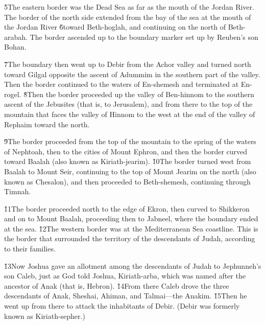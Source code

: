 \v{5}The eastern border was the Dead Sea as far as the mouth of the Jordan River. The border of the north side extended from the bay of the sea at the mouth of the Jordan River \v{6}toward Beth-hoglah, and continuing on the north of Beth-arabah. The border ascended up to the boundary marker set up by Reuben's son Bohan.

\v{7}The boundary then went up to Debir from the Achor valley and turned north toward Gilgal opposite the ascent of Adummim in the southern part of the valley. Then the border continued to the waters of En-shemesh and terminated at En-rogel. \v{8}Then the border proceeded up the valley of Ben-hinnom to the southern ascent of the Jebusites (that is, to Jerusalem), and from there to the top of the mountain that faces the valley of Hinnom to the west at the end of the valley of Rephaim toward the north.

\v{9}The border proceeded from the top of the mountain to the spring of the waters of Nephtoah, then to the cities of Mount Ephron, and then the border curved toward Baalah (also known as Kiriath-jearim). \v{10}The border turned west from Baalah to Mount Seir, continuing to the top of Mount Jearim on the north (also known as Chesalon), and then proceeded to Beth-shemesh, continuing through Timnah.

\v{11}The border proceeded north to the edge of Ekron, then curved to Shikkeron and on to Mount Baalah, proceeding then to Jabneel, where the boundary ended at the sea. \v{12}The western border was at the Mediterranean Sea coastline. This is the border that surrounded the territory of the descendants of Judah, according to their families.

\v{13}Now Joshua gave an allotment among the descendants of Judah to Jephunneh's son Caleb, just as God told Joshua, Kiriath-arba, which was named after the ancestor of Anak (that is, Hebron). \v{14}From there Caleb drove the three descendants of Anak, Sheshai, Ahiman, and Talmai---the Anakim. \v{15}Then he went up from there to attack the inhabitants of Debir. (Debir was formerly known as Kiriath-sepher.)

